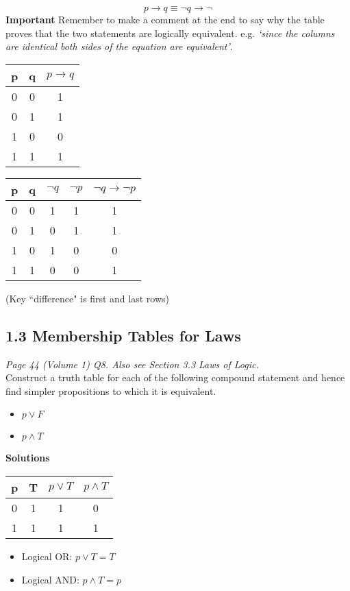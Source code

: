 \documentclass[]{report}
\begin{document}
\[ p \rightarrow q \equiv \neg q \rightarrow \neg\]
\textbf{Important} Remember to make a comment at the end to say why the table proves that the two statements are logically equivalent. e.g. \emph{‘since the columns are identical both sides of the equation are equivalent’}.
{ 
\begin{tabular}{|c|c||c|}
\hline  p&  q& $p \rightarrow q$ \\ 
\hline  0&  0&  1\\ 
\hline  0&  1&  1\\ 
\hline  1&  0&  0\\ 
\hline  1&  1&  1\\ 
\hline 
\end{tabular} \hspace{0.5cm} \begin{tabular}{|c|c||c|c|c|}
\hline  p&  q& $\neg q$ & $\neg p$ & $\neg q \rightarrow \neg p$ \\ 
\hline  0&  0& 1& 1& 1\\ 
\hline  0&  1& 0& 1& 1\\ 
\hline  1&  0& 1& 0& 0\\ 
\hline  1&  1& 0& 0& 1\\ 
\hline 
\end{tabular}
} 
(Key ``difference" is first and last rows)
\subsection*{1.3 Membership Tables for Laws}
\emph{Page 44 (Volume 1) Q8.
Also see Section 3.3 Laws of Logic.}\\

Construct a truth table for each of the following compound statement and hence find simpler propositions to which it is equivalent.


\begin{itemize}
\item $p \vee F$
\item $p \wedge T$
\end{itemize}
\textbf{Solutions}
\begin{center}
{
\begin{tabular}{|c|c||c|c|}
\hline  p & T & $p \vee T$ & $ p \wedge T$ \\ \hline
\hline  0 & 1 & 1 & 0 \\ 
\hline  1 &  1 & 1 & 1 \\ 
\hline 
\end{tabular} 
}
\end{center}
\begin{itemize}
\item Logical OR: $p \vee T = T $
\item Logical AND: $p \wedge T = p  $
\end{itemize}
\end{document}
